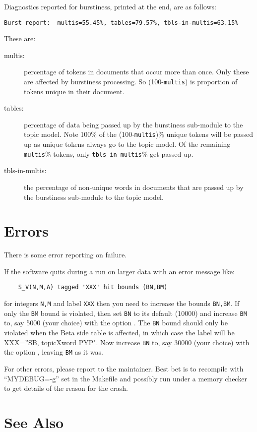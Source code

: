 \documentclass[a4paper,english]{article}
\begin{document}
Diagnostics reported for burstiness, printed at the end, are as follows:
\begin{verbatim}
Burst report:  multis=55.45%, tables=79.57%, tbls-in-multis=63.15%
\end{verbatim}
These are:
\begin{description}
\item[multis:] percentage of tokens in documents that occur more than
once.  Only these are affected by burstiness processing. 
So (100-\texttt{multis}) is proportion of tokens unique in
their document.  
\item[tables:] percentage of data being passed up by the burstiness
sub-module to the topic model.  
Note 100\% of the  (100-\texttt{multis})\% unique tokens will
be passed up as unique tokens always go to the topic model.
Of the remaining \texttt{multis}\% tokens, only 
\texttt{tbls-in-multis}\% get passed up.
\item[tbls-in-multis:] the percentage of 
non-unique words in documents that are passed up by the burstiness
sub-module to the topic model.  
\end{description}


\section{Errors}

There is some error reporting on failure.

If the software quits during a run on larger data with an
error message like:
\begin{verbatim}
    S_V(N,M,A) tagged 'XXX' hit bounds (BN,BM)
\end{verbatim}
for integers \texttt{N,M} and label \texttt{XXX} then you
need to increase the bounds \texttt{BN,BM}.
If only the \texttt{BM} bound is violated,
then set \texttt{BN} to its default (10000) and increase
\texttt{BM} to, say 5000 (your choice) with the
option .
The \texttt{BN} bound should only be violated
when the Beta side table is affected,
in which case the label will be
XXX=''SB, topicXword PYP".
Now increase \texttt{BN} to, say 30000 (your choice) with the
option ,
leaving \texttt{BM} as it was.

For other errors, please report to the maintainer.
Best bet is to recompile 
with ``MYDEBUG=-g'' set in the Makefile
and possibly run under a memory checker to get details of
the reason for the crash.

\section{See Also}
\end{document}
